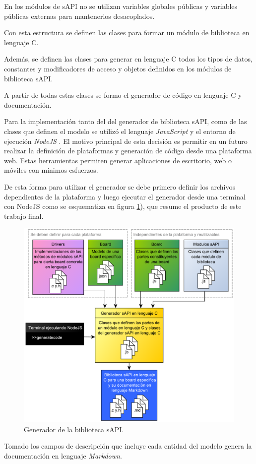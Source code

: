En los módulos de sAPI no se utilizan variables globales públicas y variables públicas externas para mantenerlos desacoplados.

Con esta estructura se definen las clases para formar un módulo de biblioteca en lenguaje C.

Además, se definen las clases para generar en lenguaje C todos los tipos de datos, constantes y modificadores de acceso y objetos definidos en los módulos de biblioteca sAPI.

A partir de todas estas clases se formo el generador de código en lenguaje C y documentación.

Para la implementación tanto del del generador de biblioteca sAPI, como de las clases que definen el modelo se utilizó el lenguaje \emph{JavaScript} \citep{JavaScript} y el entorno de ejecución \emph{NodeJS} \citep{NodeJS}. El motivo principal de esta decisión es permitir en un futuro realizar la definición de plataformas y generación de código desde una plataforma web. Estas herramientas permiten generar aplicaciones de escritorio, web o móviles con mínimos esfuerzos.

De esta forma para utilizar el generador se debe primero definir los archivos dependientes de la plataforma y luego ejecutar el generador desde una terminal con NodeJS como se esquematiza en figura \ref{fig:fullSapiGen}), que resume el producto de este trabajo final.

\begin{figure}[!htbp]
\begin{center}  %
\includegraphics*[width=14.5cm]{Figures/sapi_gen2.pdf}
\par\caption{Generador de la biblioteca sAPI.}\label{fig:fullSapiGen}
\end{center}
\end{figure}

Tomado los campos de descripción que incluye cada entidad del modelo genera la documentación en lenguaje \emph{Markdown}. 
